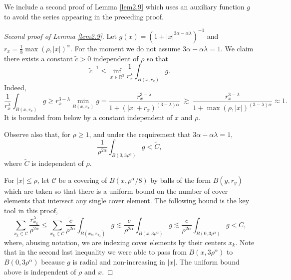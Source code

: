 \documentclass[11pt]{article}
\numberwithin{equation}{section}
\theoremstyle{remark}
\theoremstyle{definition}
\newcommand{\R}{\mathbb{R}}
\newcommand{\gec}{{\ \gtrsim \ }}
\newcommand\al{\alpha}
\newcommand\la{\lambda}
\newcommand{\td}{\tilde}
\newcommand{\EQ}[1]{\begin{equation} #1 \end{equation}}
\begin{document}
We include a second proof of Lemma \ref{lem2.9} which uses an auxiliary function $g$ to avoid the series appearing in the preceding proof. 

\begin{proof}[Second proof of Lemma \ref{lem2.9}]
Let $g(x)= (1+|x|^{3\al -\al \la})^{-1}$
and $r_x = \frac18\max(\rho,|x|)^\al$. {For the moment we do not assume
$3\al -\al \la=1$.}
We claim there exists a constant $\td c>0$ independent of $\rho$ so that
\EQ{\label{gintinf}
\td c^{-1}\leq \inf_{x\in \R^3}%
\frac 1 {r_x^\la}\int_{B(x,r_x)} g.
}
Indeed, %
\[
\frac 1 {r_x^\la}\int_{B(x,r_x)} g 
\ge
 r_x^{3-\la} \min_{B(x,r_x)} g =\frac{
 r_x^{3-\la}}{ 1+(|x|+r_x)^{(3-\la)\al}  }\gec
 \frac{
 r_x^{3-\la}}{ 1+\max(\rho,|x|)^{(3-\la)\al}  }\approx 1.
%
%
%
%
%
%
%
\]
It is bounded from below by a constant independent of $x$ and $\rho$.
%
%
%
%
%
%
%
%


%
%
%
%
%
%
%

%
%
%
%
%
%
%
%
Observe also that, for $\rho\geq 1$, %
and under the requirement that $3\al - \al\la=1$,%
\[
%
\frac 1 {\rho^{2\al}} \int_{B(0,3\rho^\al)} g< \td C,
\]
where $\td C$ is independent of $\rho$.


For  $|x|\leq \rho$, let $\mathcal C$ be a covering of  {$B(x,\rho^\al/8)$}
%
by balls of the form $B(y,r_y)$  which are taken so that there is a uniform bound on the number of cover elements that intersect any single cover element.  The following bound is the key tool in this proof,%
\EQ{\label{ineq.sum}
%
\sum_{x_k\in \mathcal C} \frac {r_{x_k}^\la} {\rho^{2\al}} \leq  \sum_{x_k\in \mathcal C} \frac {\td c} {\rho^{2\al}} \int_{B(x_k,r_{x_k})} g \lesssim   \frac c{\rho^{2\al}} \int_{B(x,3\rho^{\al})}  g \lesssim   \frac c{\rho^{2\al}} \int_{B(0,3\rho^{\al})}  g   <C,
}
where, abusing notation, we are indexing cover elements by their centers $x_k$.
Note that in the second last inequality we were able to pass from $B(x,3\rho^\al)$ to $B(0,3\rho^\al)$ because $g$ is radial and non-increasing in $|x|$.
The uniform bound above is independent of $\rho$ and $x$.%


\end{proof}
\end{document}
